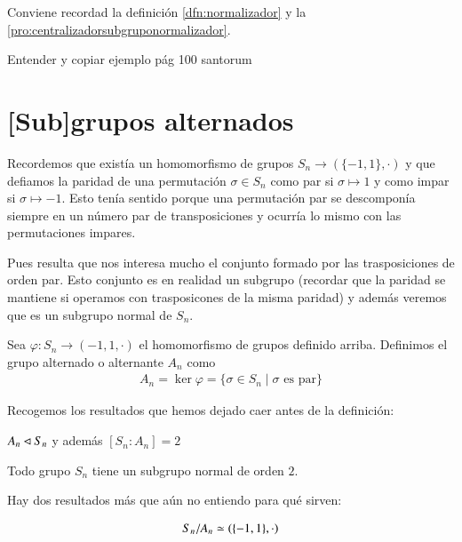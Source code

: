 Conviene recordad la definición \ref{dfn:normalizador} y la \autoref{pro:centralizadorsubgruponormalizador}.

\begin{ej}
	Entender y copiar ejemplo pág 100 santorum
\end{ej}

\section{[Sub]grupos alternados}
\label{sec:gruposalternados}

Recordemos que existía un homomorfismo de grupos $S_n  \to (\{-1, 1\}, \cdot)$ y que defiamos la paridad de una permutación $\sigma \in S_n$ como par si $\sigma \mapsto 1$ y como impar si $\sigma \mapsto -1$. Esto tenía sentido porque una permutación par se descomponía siempre en un número par de transposiciones y ocurría lo mismo con las permutaciones impares.

Pues resulta que nos interesa mucho el conjunto formado por las trasposiciones de orden par. Esto conjunto es en realidad un subgrupo (recordar que la paridad se mantiene si operamos con trasposicones de la misma paridad) y además veremos que es un subgrupo normal de $S_n$.

\begin{dfn}
	Sea $\varphi: S_n \to ({-1, 1}, \cdot)$ el homomorfismo de grupos definido arriba. Definimos el grupo alternado o alternante $A_n$ como
	\begin{align*}
	A_n = \ker \varphi = \{\sigma \in S_n \mid \sigma \text{ es par}\}
	\end{align*}
\end{dfn}

Recogemos los resultados que hemos dejado caer antes de la definición:

\begin{pro}
	$A_n \lhd S_n$ y además $[S_n : A_n] = 2$
\end{pro}

\begin{cor}
	Todo grupo $S_n$ tiene un subgrupo normal de orden $2$.
\end{cor}

Hay dos resultados más que aún no entiendo para qué sirven:

\begin{pro}
	\begin{align*}
		S_n / A_n \simeq (\{-1, 1\}, \cdot)
	\end{align*}
\end{pro}

